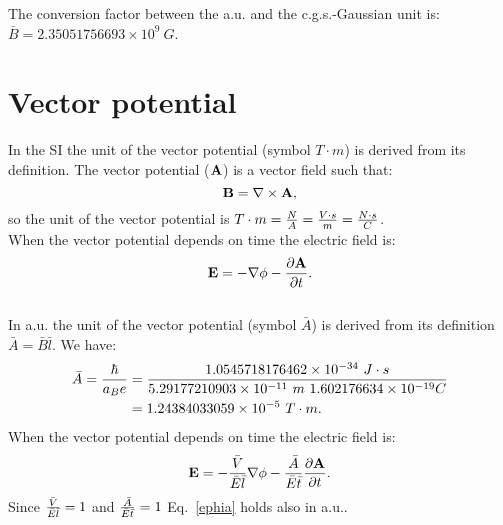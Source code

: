 \documentclass[12pt,a4paper]{article}
\def\hbarf{1.0545718176462\times 10^{-34}}
\def\e{1.602176634\times 10^{-19}}
\def\abohr{5.29177210903\times 10^{-11}}
\def\barav{1.24384033059\times 10^{-5}}
\def\toverg{9.99999999726\times 10^{3}}
\def\barbcgs{2.35051756693\times 10^{9}}
\begin{document}

{\color{green} 
The conversion factor between the a.u. and the c.g.s.-Gaussian unit is: 
$\bar B = \barbcgs\ G$.
}

\newpage
\section{\color{coral}Vector potential}

In the SI the unit of the vector potential (symbol $T \cdot m$)
is derived from its definition. The vector potential (${\bf A}$)
is a vector field such that:
\begin{equation}
{\bf B}=\nabla \times {\bf A},
\label{defav}
\end{equation}
so the unit of the vector potential is $T\cdot m={N \over A}=
{V\cdot s \over m}={N\cdot s \over C}$. \\
When the vector potential depends on time the electric field is:
\begin{equation}
{\bf E}=-\nabla \phi -{\partial {\bf A} \over \partial t}.
\label{ephia}
\end{equation}
\\

{\color{web-blue} In a.u. the unit of the vector potential
(symbol $\bar A$) is derived from its definition $\bar A = \bar B \bar l$.
We have:
\begin{align}
\bar A = {\hbar \over a_B e}&= {\hbarf\ J\cdot s \over \abohr\ m\ \e C}
\nonumber \\ 
&= \barav\ T\cdot m.
\end{align}
When the vector potential depends on time the electric field is:
\begin{equation}
{\bf E}=-{\bar V \over \bar E \bar l} \nabla \phi -
{\bar A \over \bar E \bar t} {\partial {\bf A} \over \partial t}.
\label{ephiagen}
\end{equation}
Since ${\bar V \over \bar E \bar l}=1$ and 
${\bar A \over \bar E \bar t}=1$ Eq.~\ref{ephia} holds also in a.u..
}
\\
\end{document}
